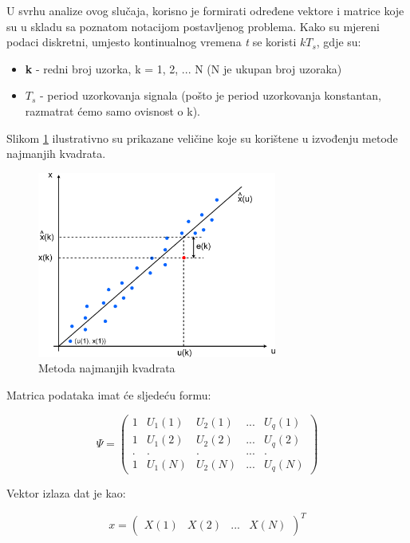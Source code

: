 U svrhu analize ovog slučaja, korisno je formirati određene vektore i matrice koje su u skladu sa poznatom notacijom postavljenog problema. Kako su mjereni podaci diskretni, umjesto kontinualnog vremena \textit{t} se koristi \textit{$kT_s$}, gdje su:

\begin{itemize}
    \item \textbf{k} - redni broj uzorka, k = 1, 2, ... N (N je ukupan broj uzoraka)
    \item \textbf{$T_s$} - period uzorkovanja signala (pošto je period uzorkovanja konstantan, razmatrat ćemo samo ovisnost o k).
\end{itemize}

Slikom \ref{fig:LS} ilustrativno su prikazane veličine koje su korištene u izvođenju metode najmanjih kvadrata.

\begin{figure}[H]
  \centering
  \includegraphics[width=0.7\textwidth]{LS}
  \caption{Metoda najmanjih kvadrata}
  \label{fig:LS}
\end{figure}

Matrica podataka imat će sljedeću formu:

\begin{equation}
    \Psi=\begin{pmatrix}
    1 & U_1(1) & U_2(1) & ... & U_q(1) \\
    1 & U_1(2) & U_2(2) & ... & U_q(2) \\
    . & . & . & ... & . \\
    1 & U_1(N) & U_2(N) & ... & U_q(N)
    \end{pmatrix}
\end{equation}

Vektor izlaza dat je kao: 

\begin{equation}
x= \begin{pmatrix}
    X(1)& X(2)& ... &X(N) 
\end{pmatrix}^T
\end{equation}

